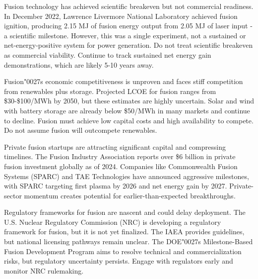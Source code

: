 \documentclass[10pt,a4paper]{article}
\newcommand{\BOApos}{{\BOQuoteFont\char"0027}}
\begin{document}
\begin{minipage}[t]{0.46\linewidth}
{\small Fusion technology has achieved scientific breakeven but not commercial readiness. In December 2022, Lawrence Livermore National Laboratory achieved fusion ignition, producing 2.15 MJ of fusion energy output from 2.05 MJ of laser input - a scientific milestone. However, this was a single experiment, not a sustained or net-energy-positive system for power generation. Do not treat scientific breakeven as commercial viability. Continue to track sustained net energy gain demonstrations, which are likely 5-10 years away.}\par
{\small Fusion\BOApos{}s economic competitiveness is unproven and faces stiff competition from renewables plus storage. Projected LCOE for fusion ranges from \$30-\$100/MWh by 2050, but these estimates are highly uncertain. Solar and wind with battery storage are already below \$50/MWh in many markets and continue to decline. Fusion must achieve low capital costs and high availability to compete. Do not assume fusion will outcompete renewables.}\par
\end{minipage}\hfill\begin{minipage}[t]{0.46\linewidth}
{\small Private fusion startups are attracting significant capital and compressing timelines. The Fusion Industry Association reports over \$6 billion in private fusion investment globally as of 2024. Companies like Commonwealth Fusion Systems (SPARC) and TAE Technologies have announced aggressive milestones, with SPARC targeting first plasma by 2026 and net energy gain by 2027. Private-sector momentum creates potential for earlier-than-expected breakthroughs.}\par
{\small Regulatory frameworks for fusion are nascent and could delay deployment. The U.S. Nuclear Regulatory Commission (NRC) is developing a regulatory framework for fusion, but it is not yet finalized. The IAEA provides guidelines, but national licensing pathways remain unclear. The DOE\BOApos{}s Milestone-Based Fusion Development Program aims to resolve technical and commercialization risks, but regulatory uncertainty persists. Engage with regulators early and monitor NRC rulemaking.}\par
\end{minipage}
\end{document}
